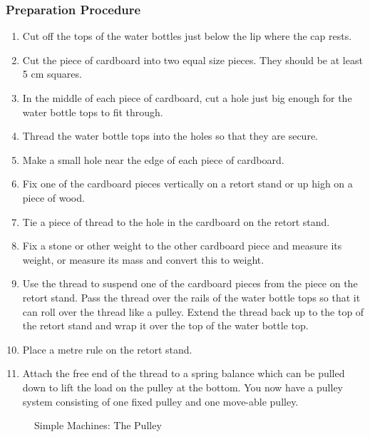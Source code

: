 \subsubsection*{Preparation Procedure}
\begin{enumerate}
\item{Cut off the tops of the water bottles just below the lip where the cap rests.}
\item{Cut the piece of cardboard into two equal size pieces.  They should be at least 5 cm squares.}
\item{In the middle of each piece of cardboard, cut a hole just big enough for the water bottle tops to fit through.}
\item{Thread the water bottle tops into the holes so that they are secure.}
\item{Make a small hole near the edge of each piece of cardboard.}
\item{Fix one of the cardboard pieces vertically on a retort stand or up high on a piece of wood.}
\item{Tie a piece of thread to the hole in the cardboard on the retort stand.}
\item{Fix a stone or other weight to the other cardboard piece and measure its weight, or measure its mass and convert this to weight.}
\item{Use the thread to suspend one of the cardboard pieces from the piece on the retort stand.  Pass the thread over the rails of the water bottle tops so that it can roll over the thread like a pulley.  Extend the thread back up to the top of the retort stand and wrap it over the top of the water bottle top.}
\item{Place a metre rule on the retort stand.}
\item{Attach the free end of the thread to a spring balance which can be pulled down to lift the load on the pulley at the bottom.  You now have a pulley system consisting of one fixed pulley and one move-able pulley.}
\end{enumerate}

\begin{figure}
\begin{center}
\def\svgwidth{150pt}

\caption{Simple Machines: The Pulley}
\label{fig:block-n-tackle}
\end{center}
\end{figure}


